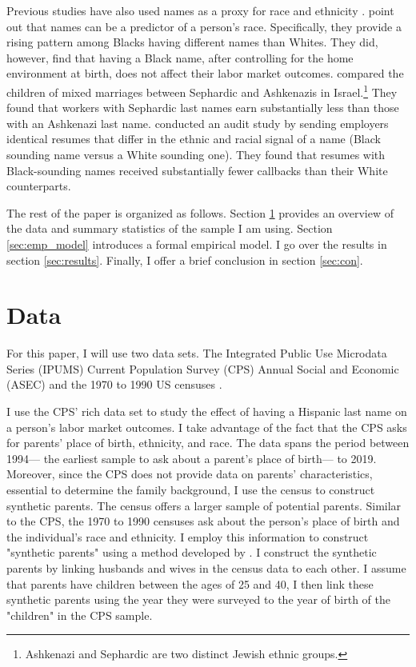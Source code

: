 \documentclass{wptemp}
\begin{document}
Previous studies have also used names as a proxy for race and ethnicity \citep{fryer2004causes, rubinstein2014pride, bertrand2004emily}. \citet{fryer2004causes} point out that names can be a predictor of a person's race. Specifically, they provide a rising pattern among Blacks having different names than Whites. They did, however, find that having a Black name, after controlling for the home environment at birth, does not affect their labor market outcomes. \citet{rubinstein2014pride} compared the children of mixed marriages between Sephardic and Ashkenazis in Israel.\footnote{Ashkenazi and Sephardic are two distinct Jewish ethnic groups.} They found that workers with Sephardic last names earn substantially less than those with an Ashkenazi last name. \citet{bertrand2004emily} conducted an audit study by sending employers identical resumes that differ in the ethnic and racial signal of a name (Black sounding name versus a White sounding one). They found that resumes with Black-sounding names received substantially fewer callbacks than their White counterparts. 

The rest of the paper is organized as follows. Section \ref{sec:data} provides an overview of the data and summary statistics of the sample I am using. Section \ref{sec:emp_model} introduces a formal empirical model. I go over the results in section \ref{sec:results}. Finally, I offer a brief conclusion in section \ref{sec:con}.

\section{Data}\label{sec:data}

For this paper, I will use two data sets. The Integrated Public Use Microdata Series (IPUMS) Current Population Survey (CPS) Annual Social and Economic (ASEC) \citep{cps2019} and the 1970 to 1990 US censuses \citep{acs2019}. 

I use the CPS' rich data set to study the effect of having a Hispanic last name on a person's labor market outcomes. I take advantage of the fact that the CPS asks for parents' place of birth, ethnicity, and race. The data spans the period between 1994--- the earliest sample to ask about a parent's place of birth--- to 2019. Moreover, since the CPS does not provide data on parents' characteristics, essential to determine the family background, I use the census to construct synthetic parents. The census offers a larger sample of potential parents. Similar to the CPS, the 1970 to 1990 censuses ask about the person's place of birth and the individual's race and ethnicity. I employ this information to construct "synthetic parents" using a method developed by \citet{rubinstein2014pride}. I construct the synthetic parents by linking husbands and wives in the census data to each other. I assume that parents have children between the ages of 25 and 40, I then link these synthetic parents using the year they were surveyed to the year of birth of the "children" in the CPS sample.
\end{document}
